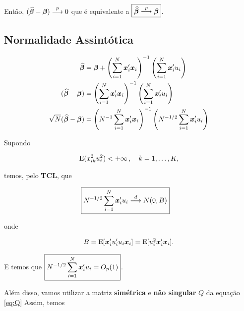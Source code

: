 \documentclass[11pt, oneside, a4paper, article]{article}
\numberwithin{equation}{section}
\begin{document}
Então, 
$(\widehat{\boldsymbol{\beta}} - \boldsymbol{\beta})  \overset{p}{\longrightarrow}  0$ 
que é equivalente a 
$\boxed{\widehat{\boldsymbol{\beta}}  \overset{p}{\longrightarrow}  \boldsymbol{\beta}}$.

\subsection{Normalidade Assintótica} %

\vspace{-2 em}
\begin{align*}
\widehat{\boldsymbol{\beta}} 
&= 
\boldsymbol{\beta} +
\left( \sum_{i=1}^{N} \boldsymbol{x}_{i}' \boldsymbol{x}_{i} \right)^{-1}
\left( \sum_{i=1}^{N} \boldsymbol{x}_{i}' u_{i} \right)
\\
(\widehat{\boldsymbol{\beta}} - \boldsymbol{\beta})
&=
\left( \sum_{i=1}^{N} \boldsymbol{x}_{i}' \boldsymbol{x}_{i} \right)^{-1}
\left( \sum_{i=1}^{N} \boldsymbol{x}_{i}' u_{i} \right)
\\
\sqrt{N} (\widehat{\boldsymbol{\beta}} - \boldsymbol{\beta}) &=
\left( N^{-1} \sum_{i=1}^{N} \boldsymbol{x}_{i}' \boldsymbol{x}_{i} \right)^{-1}
\left( N^{-1/2} \sum_{i=1}^{N} \boldsymbol{x}_{i}' u_{i} \right)
\end{align*}

\noindent
Supondo

\vspace{-1 em}
\begin{align*}
	\text{E}( x_{ik}^{2} u_{i}^{2} ) < + \infty \, , \quad k=1, \dots, K, 
\end{align*}

\noindent
temos, pelo \textbf{TCL}, que

\vspace{-1 em}
\begin{align} \label{eq:limxu}
\Aboxed{ N^{-1/2} \sum_{i=1}^{N} \mbs{x}_{i}' u_{i} \arrowd N(0, B) }
\end{align}

\noindent
onde 

\vspace{-1 em}
\begin{align*}
B =
\text{E}[\boldsymbol{x}_{i}' u_{i}' u_{i} \boldsymbol{x}_{i}] =
\text{E}[ u_{i}^2 \boldsymbol{x}_{i}' \boldsymbol{x}_{i} ].
\end{align*}

E temos que $\boxed{N^{-1/2} \sum_{i=1}^{N} \boldsymbol{x}_{i}' u_{i} = O_{p}(1)}$.

\vspace{1 em}
Além disso, vamos utilizar a matriz \textbf{simétrica} e \textbf{não singular} $Q$ da equação \eqref{eq:Q}
Assim, temos 
\end{document}
